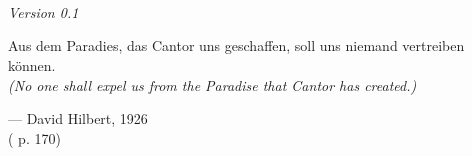 

\linespread{1.05}

\renewcommand{\thetheorem}{\arabic{part}.\arabic{chapter}.\arabic{section}.\arabic{theorem}}
\renewcommand{\theexercisehidden}{\arabic{part}.\arabic{chapter}.\arabic{exercisehidden}}
\renewcommand{\theproblem}{\arabic{part}.\arabic{chapter}.\arabic{problem}}


\begin{titlepage}
    \\
    \vspace{20mm}
    \\
    \vspace{\fill}
    \centering \large{\the\year}\\
    \centering \small{\textit{Version 0.1}}
\end{titlepage}

\newpage{}
\thispagestyle{empty}

\vspace*{2cm}

\begin{center}
    \Large{\parbox{10cm}{
        \begin{raggedright}
        {
            \large
            Aus dem Paradies, das Cantor uns geschaffen, soll uns niemand vertreiben können.\\
            \textit{(No one shall expel us from the Paradise that Cantor has created.)}
        }

            \vspace{.5cm}
            \hfill{--- David Hilbert, 1926}\\
            \vspace{-.25cm}
            \normalsize
            \hfill{(\cite{hilbert_1926} p. 170)}
        \end{raggedright}
    }
}
\end{center}

